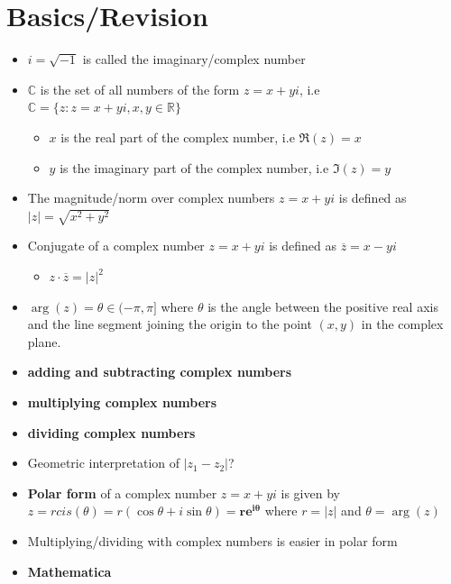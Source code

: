 \documentclass[12pt]{article}
\begin{document}
\section{Basics/Revision}
\begin{itemize}
    \item $i = \sqrt{-1}$ is called the imaginary/complex number 
    \item $\mathbb{C}$ is the set of all numbers of the form $z = x + y i$, i.e $\mathbb{C} = \{ z : z = x + y i, x,y \in \mathbb{R} \}$
    \begin{itemize}
        \item $x$ is the real part of the complex number, i.e $\Re(z) = x$
        \item $y$ is the imaginary part of the complex number, i.e $\Im(z) = y$
    \end{itemize}
    \item The magnitude/norm over complex numbers $z = x + y i$ is defined as $|z| = \sqrt{x ^{2} + y ^{2}}$
    \item Conjugate of a complex number $z = x + y i$ is defined as $\overline{z} = x - y i$
    \begin{itemize}
        \item $z \cdot \overline{z} = |z|^2$
    \end{itemize}
    \item $\arg(z) = \theta \in (-\pi  , \pi ]$ where $\theta$ is the angle between the positive real axis and the line segment joining the origin to the point $(x,y)$ in the complex plane.
    \item \textbf{adding and subtracting complex numbers}
    \vspace{2cm}
    \item \textbf{multiplying complex numbers}
    \vspace{3cm}
    \item \textbf{dividing complex numbers}
    \vspace{5cm}
    \item Geometric interpretation of $|z_{1} - z_{2}|$?
    \item \textbf{Polar form} of a complex number $z = x + y i$ is given by $z = r cis(\theta) = r (\cos \theta + i \sin \theta ) \mathbf{ =  re^{i\theta }}$ where $r = |z|$ and $\theta = \arg(z)$
    \item Multiplying/dividing with complex numbers is easier in polar form 
    \item \textbf{Mathematica} 
    \begin{itemize}

\end{itemize}
\end{itemize}
\end{document}
